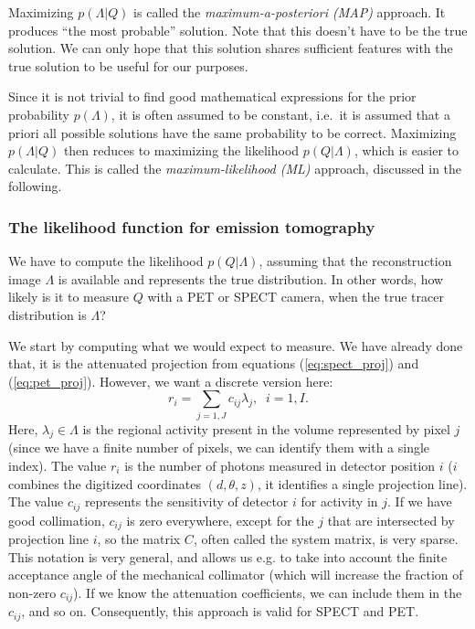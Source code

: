 \documentclass[11pt,oneside]{book}
\begin{document}
Maximizing $p(\Lambda | Q)$ is called the {\em maximum-a-posteriori (MAP)}
approach. It produces ``the most probable'' solution. Note that this doesn't
have to be the true solution. We can only hope that this solution shares
sufficient features with the true solution to be useful for our purposes.

Since it is not trivial to find good mathematical expressions for the prior
probability $p(\Lambda)$, it is often assumed to be constant, i.e.\ it is
assumed that a priori all possible solutions have the same probability to be
correct.  Maximizing $p(\Lambda | Q)$ then reduces to maximizing the
likelihood $p(Q | \Lambda)$, which is easier to calculate.  This is called the
{\em maximum-likelihood (ML)} approach, discussed in the following.

\subsubsection{The likelihood function for emission tomography}
We have to compute the likelihood $p(Q | \Lambda)$, assuming that the
reconstruction image $\Lambda$ is available and represents the true
distribution. In other words, how likely is it to measure $Q$ with a PET or
SPECT camera, when the true tracer distribution is $\Lambda$?

We start by computing what we would expect to measure. We have already
done that, it is the attenuated projection from equations
(\ref{eq:spect_proj}) and (\ref{eq:pet_proj}). However, we want a
discrete version here:
\begin{equation}
  r_i = \sum_{j=1,J} c_{ij} \lambda_j, \;\; i = 1,I.  \label{jn:mlproj}
\end{equation}
Here, $\lambda_j \in \Lambda$ is the regional activity present in the
volume represented by pixel $j$ (since we have a finite number of
pixels, we can identify them with a single index). The value $r_i$ is
the number of photons measured in detector position $i$ ($i$ combines
the digitized coordinates $(d,\theta,z)$, it identifies a single
projection line). The value $c_{ij}$ represents the sensitivity of
detector $i$ for activity in $j$. If we have good collimation,
$c_{ij}$ is zero everywhere, except for the $j$ that are intersected
by projection line $i$, so the matrix $C$, often called the system
matrix, is very sparse. This notation is very general, and allows us
e.g. to take into account the finite acceptance angle of the
mechanical collimator (which will increase the fraction of non-zero
$c_{ij}$). If we know the attenuation coefficients, we can include
them in the $c_{ij}$, and so on. Consequently, this approach is valid
for SPECT and PET.
\end{document}
